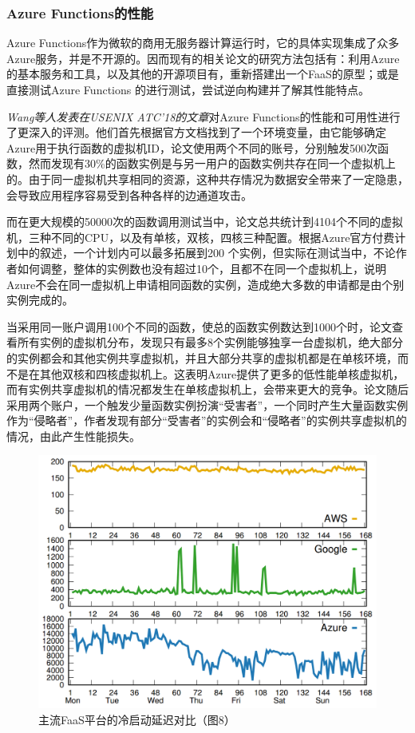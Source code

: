 \subsubsection{Azure Functions的性能}
Azure Functions作为微软的商用无服务器计算运行时，它的具体实现集成了众多Azure服务，并是不开源的。因而现有的相关论文的研究方法包括有：利用Azure的基本服务和工具，以及其他的开源项目有，重新搭建出一个FaaS的原型\cite{mcgrath2017serverless}；或是直接测试Azure Functions 的进行测试，尝试逆向构建并了解其性能特点\cite{wang2018peeking}。

\cite{wang2018peeking}{\textit{Wang等人发表在USENIX ATC’18的文章}}对Azure Functions的性能和可用性进行了更深入的评测。他们首先根据官方文档找到了一个环境变量，由它能够确定Azure用于执行函数的虚拟机ID，论文使用两个不同的账号，分别触发500次函数，然而发现有30\%的函数实例是与另一用户的函数实例共存在同一个虚拟机上的。由于同一虚拟机共享相同的资源，这种共存情况为数据安全带来了一定隐患，会导致应用程序容易受到各种各样的边通道攻击。

而在更大规模的50000次的函数调用测试当中，论文总共统计到4104个不同的虚拟机，三种不同的CPU，以及有单核，双核，四核三种配置。根据Azure官方付费计划中的叙述，一个计划内可以最多拓展到200 个实例，但实际在测试当中，不论作者如何调整，整体的实例数也没有超过10个，且都不在同一个虚拟机上，说明Azure不会在同一虚拟机上申请相同函数的实例，造成绝大多数的申请都是由个别实例完成的。

当\cite{wang2018peeking}采用同一账户调用100个不同的函数，使总的函数实例数达到1000个时，论文查看所有实例的虚拟机分布，发现只有最多8个实例能够独享一台虚拟机，绝大部分的实例都会和其他实例共享虚拟机，并且大部分共享的虚拟机都是在单核环境，而不是在其他双核和四核虚拟机上。这表明Azure提供了更多的低性能单核虚拟机，而有实例共享虚拟机的情况都发生在单核虚拟机上，会带来更大的竞争。论文随后采用两个账户，一个触发少量函数实例扮演“受害者”，一个同时产生大量函数实例作为“侵略者”，作者发现有部分“受害者”的实例会和“侵略者”的实例共享虚拟机的情况，由此产生性能损失。
\begin{figure}[!htbp]
	\centering
	\includegraphics[scale=0.5]{figs/ColdStart.PNG}
	\caption{主流FaaS平台的冷启动延迟对比（\cite{wang2018peeking}图8）}
	\label{figs:cold}
\end{figure}

